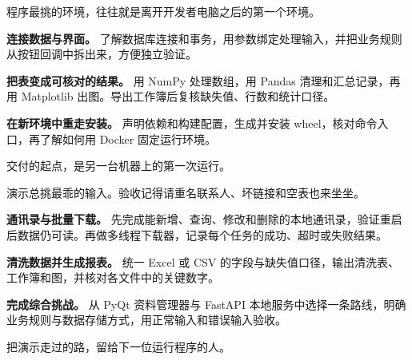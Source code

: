 \documentclass[UTF8,a4paper,oneside,openany,fontset=none,11pt]{ctexbook}
\begin{document}
  {程序最挑的环境，往往就是离开开发者电脑之后的第一个环境。}
  {\textbf{连接数据与界面。} 了解数据库连接和事务，用参数绑定处理输入，并把业务规则从按钮回调中拆出来，方便独立验证。

   \textbf{把表变成可核对的结果。} 用 NumPy 处理数组，用 Pandas 清理和汇总记录，再用 Matplotlib 出图。导出工作簿后复核缺失值、行数和统计口径。

   \textbf{在新环境中重走安装。} 声明依赖和构建配置，生成并安装 wheel，核对命令入口，再了解如何用 Docker 固定运行环境。}
  {交付的起点，是另一台机器上的第一次运行。}





  {演示总挑最乖的输入。验收记得请重名联系人、坏链接和空表也来坐坐。}
  {\textbf{通讯录与批量下载。} 先完成能新增、查询、修改和删除的本地通讯录，验证重启后数据仍可读。再做多线程下载器，记录每个任务的成功、超时或失败结果。

   \textbf{清洗数据并生成报表。} 统一 Excel 或 CSV 的字段与缺失值口径，输出清洗表、工作簿和图，并核对各文件中的关键数字。

   \textbf{完成综合挑战。} 从 PyQt 资料管理器与 FastAPI 本地服务中选择一条路线，明确业务规则与数据存储方式，用正常输入和错误输入验收。}
  {把演示走过的路，留给下一位运行程序的人。}


\appendix



\end{document}
